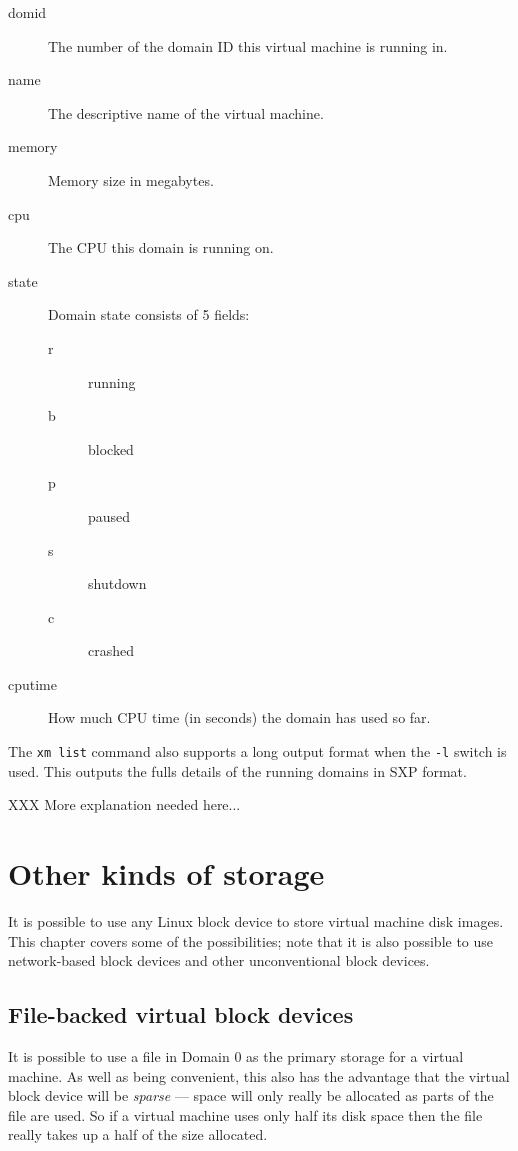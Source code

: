 \documentclass[11pt,twoside,final,openright]{xenstyle}
\begin{document}
\begin{description}
\item[domid] The number of the domain ID this virtual machine is running in.
\item[name]  The descriptive name of the virtual machine.
\item[memory] Memory size in megabytes.
\item[cpu]   The CPU this domain is running on.
\item[state] Domain state consists of 5 fields:
  \begin{description}
  \item[r] running
  \item[b] blocked
  \item[p] paused
  \item[s] shutdown
  \item[c] crashed
  \end{description}
\item[cputime] How much CPU time (in seconds) the domain has used so far.
\end{description}

The {\tt xm list} command also supports a long output format when the
{\tt -l} switch is used.  This outputs the fulls details of the
running domains in SXP format.

 XXX More explanation needed here...

\chapter{Other kinds of storage}

It is possible to use any Linux block device to store virtual machine
disk images.  This chapter covers some of the possibilities; note that
it is also possible to use network-based block devices and other
unconventional block devices.

\section{File-backed virtual block devices}

It is possible to use a file in Domain 0 as the primary storage for a
virtual machine.  As well as being convenient, this also has the
advantage that the virtual block device will be {\em sparse} --- space
will only really be allocated as parts of the file are used.  So if a
virtual machine uses only half its disk space then the file really
takes up a half of the size allocated.
\end{document}
